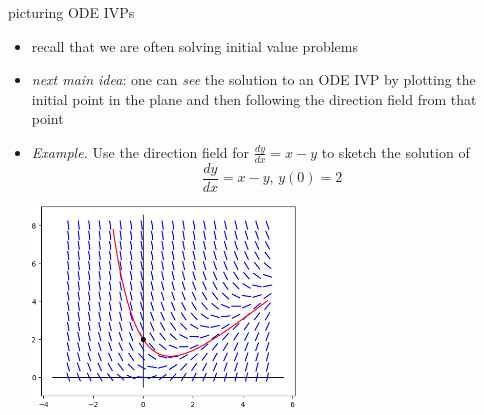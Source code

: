 \documentclass{beamer}
\begin{document}
\begin{frame}{picturing ODE IVPs}

\begin{itemize}
\item recall that we are often solving initial value problems
\item \emph{next main idea}:  one can \emph{see} the solution to an ODE IVP by plotting the initial point in the plane and then following the direction field from that point

\bigskip
\item \begin{minipage}[t]{0.32\textwidth} \small
\emph{Example.}  Use the direction field for
$\frac{dy}{dx} = x-y$ to sketch the solution of
    $$\frac{dy}{dx} = x-y, \, y(0)=2$$
\end{minipage}

\vspace{-25mm}
\hfill \includegraphics[width=0.55\textwidth]{figs/example-field-solution}
\end{itemize}
\end{frame}
\end{document}
